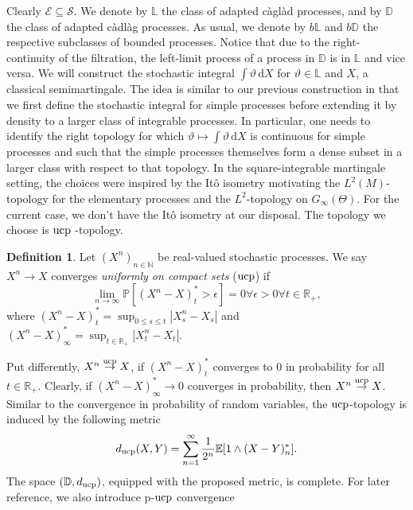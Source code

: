 \documentclass[11pt,a4paper,twoside,openany]{report}
\numberwithin{equation}{section}
\newcommand{\diff}{\mathrm{d}}
\theoremstyle{plain} %
\theoremstyle{definition} %
\newtheorem{definition}[theorem]{Definition}
\theoremstyle{remark} %
\begin{document}
Clearly \(\mathcal{E}\subseteq\mathcal{S}\). We denote by \(\mathbb{L}\) the class of adapted càglàd processes, and by \(\mathbb{D}\) the class of adapted càdlàg processes. As usual, we denote by \(b\mathbb{L}\) and \(b\mathbb{D}\) the respective subclasses of bounded processes. Notice that due to the right-continuity of the filtration, the left-limit process of a process in \(\mathbb{D}\) is in \(\mathbb{L}\) and vice versa. We will construct the stochastic integral \(\int \vartheta\,\diff X\) for \(\vartheta\in \mathbb{L}\) and \(X\), a classical semimartingale. The idea is similar to our previous construction in that we first define the stochastic integral for simple processes before extending it by density to a larger class of integrable processes. In particular, one needs to identify the right topology for which \(\vartheta\mapsto \int\vartheta\,\diff X\) is continuous for simple processes and such that the simple processes themselves form a dense subset in a larger class with respect to that topology. In the square-integrable martingale setting, the choices were inspired by the Itô isometry motivating the \(L^2(M)\)-topology for the elementary processes and the \(L^2\)-topology on \(G_{\infty}(\Theta)\). For the current case, we don't have the Itô isometry at our disposal. The topology we choose is \(\rm{ucp}\)
-topology. 
\begin{definition}\label{def:UCP convergence}
    Let \((X^n)_{n\in\mathbb{N}}\) be real-valued stochastic processes. We say \(X^n\to X\) converges \textit{uniformly on compact sets} (\(\rm{ucp}\)) if 
    \begin{equation*}
        \lim_{n\to\infty}\mathbb{P}[(X^n-X)^*_t>\epsilon]=0\forall\epsilon>0\forall t\in\mathbb{R}_+,
    \end{equation*}
    where \((X^n-X)^*_t=\sup_{0\leq s\leq t}|X^n_s-X_s|\) and  \((X^n-X)^*_{\infty}=\sup_{t\in\mathbb{R}_+}|X^n_t-X_t|\). 
\end{definition}
Put differently, \(X^n\overset{\rm{ucp}}{\to}X\), if \((X^n-X)^*_t\) converges to \(0\) in probability for all \(t\in\mathbb{R}_+\). 
Clearly, if \((X^n-X)_{\infty}^*\to 0\) converges in probability, then \(X^n\overset{\rm{ucp}}{\to}X\). Similar to the convergence in probability of random variables, the \(\rm{ucp}\)-topology is induced by the following metric
\begin{equation*}
    d_{\rm{ucp}}(X,Y)=\sum_{n=1}^{\infty}\frac{1}{2^n}\mathbb{E}[1\wedge(X-Y)^*_n].
\end{equation*}
The space \((\mathbb{D},d_{\rm{ucp}})\), equipped with the proposed metric, is complete. For later reference, we also introduce p-\(\rm{ucp}\) convergence
\end{document}
